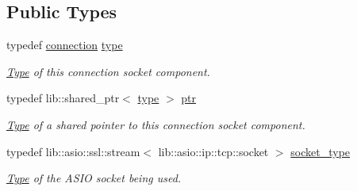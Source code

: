\subsection*{Public Types}
\begin{DoxyCompactItemize}
\item 
\mbox{\label{classwebsocketpp_1_1transport_1_1asio_1_1tls__socket_1_1connection_a13b5aceec8084df22fbce516365e1dc8}} 
typedef \mbox{\hyperlink{classwebsocketpp_1_1transport_1_1asio_1_1tls__socket_1_1connection}{connection}} \mbox{\hyperlink{classwebsocketpp_1_1transport_1_1asio_1_1tls__socket_1_1connection_a13b5aceec8084df22fbce516365e1dc8}{type}}
\begin{DoxyCompactList}\small\item\em \mbox{\hyperlink{struct_type}{Type}} of this connection socket component. \end{DoxyCompactList}\item 
\mbox{\label{classwebsocketpp_1_1transport_1_1asio_1_1tls__socket_1_1connection_a2aa605c27a476eba644e062dc5bc4f6d}} 
typedef lib\+::shared\+\_\+ptr$<$ \mbox{\hyperlink{classwebsocketpp_1_1transport_1_1asio_1_1tls__socket_1_1connection_a13b5aceec8084df22fbce516365e1dc8}{type}} $>$ \mbox{\hyperlink{classwebsocketpp_1_1transport_1_1asio_1_1tls__socket_1_1connection_a2aa605c27a476eba644e062dc5bc4f6d}{ptr}}
\begin{DoxyCompactList}\small\item\em \mbox{\hyperlink{struct_type}{Type}} of a shared pointer to this connection socket component. \end{DoxyCompactList}\item 
\mbox{\label{classwebsocketpp_1_1transport_1_1asio_1_1tls__socket_1_1connection_a99c358b4afc58ee1b1b60cf32fcf5c87}} 
typedef lib\+::asio\+::ssl\+::stream$<$ lib\+::asio\+::ip\+::tcp\+::socket $>$ \mbox{\hyperlink{classwebsocketpp_1_1transport_1_1asio_1_1tls__socket_1_1connection_a99c358b4afc58ee1b1b60cf32fcf5c87}{socket\+\_\+type}}
\begin{DoxyCompactList}\small\item\em \mbox{\hyperlink{struct_type}{Type}} of the A\+S\+IO socket being used. \end{DoxyCompactList}\item 

\end{DoxyCompactItemize}
